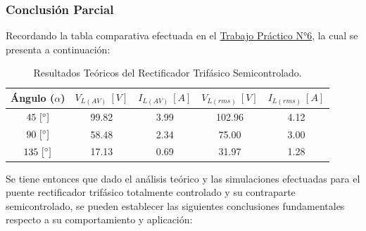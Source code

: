 \documentclass[12pt,a4paper]{article}
\begin{document}
\subsubsection{Conclusión Parcial}
Recordando la tabla comparativa efectuada en el \href{https://github.com/ErnestMonja/Electronica-Industrial/tree/main/TPT6%20%20%20-%20Tiristores}{Trabajo Práctico N°6}, la cual se presenta a continuación:

\begin{table}[H]
    \centering
    \begin{tabular}{|c|c|c|c|c|} \hline
        \textbf{Ángulo ($\alpha$)} & $V_{L(AV)} \ [V]$ & $I_{L(AV)} \ [A]$ & $V_{L(rms)} \ [V]$ & $I_{L(rms)} \ [A]$ \\ \hline
            $45 \ [\degree]$   & 99.82 & 3.99 & 102.96 & 4.12 \\ \hline
            $90 \ [\degree]$   & 58.48 & 2.34 & 75.00 & 3.00 \\ \hline
            $135 \ [\degree]$  & 17.13 & 0.69 & 31.97 & 1.28 \\ \hline
    \end{tabular}
    \caption{Resultados Teóricos del Rectificador Trifásico Semicontrolado.}
    \label{tab:tab_2}
\end{table}

Se tiene entonces que dado el análisis teórico y las simulaciones efectuadas para el puente rectificador trifásico totalmente controlado y su contraparte semicontrolado, se pueden establecer las siguientes conclusiones fundamentales respecto a su comportamiento y aplicación:
\end{document}
